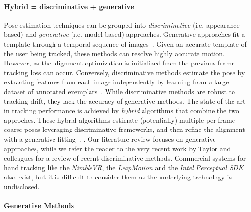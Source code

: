 \paragraph{Hybrid = discriminative + generative}
Pose estimation techniques can be grouped into \emph{discriminative} (i.e. appearance-based) and \emph{generative} (i.e. model-based) approaches. 
Generative approaches fit a template through a temporal sequence of images~\cite{oiko2011hand,melax2013dynamics,schroder2014real,tagliasacchi2015robust}. Given an accurate template of the user being tracked, these methods can resolve highly accurate motion. However, as the alignment optimization is initialized from the previous frame tracking loss can occur. 
Conversely, discriminative methods estimate the pose by extracting features from each image independently by learning from a large dataset of annotated exemplars~\cite{keskin2012hand,tang2013real,tejani2014latent,sun2015cascaded}. While discriminative methods are robust to tracking drift, they lack the accuracy of generative methods. 
The state-of-the-art in tracking performance is achieved by \emph{hybrid} algorithms that combine the two approches. These hybrid algorithms estimate (potentially) multiple per-frame coarse poses leveraging discriminative frameworks, and then refine the alignment with a generative fitting~\cite{tompson2014real,qian2014realtime,sharp2015accurate,sridhar2015fast}. 
.
Our literature review focuses on generative approaches, while we refer the reader to the very recent work by Taylor and colleagues  for a review of recent discriminative methods. Commercial systems for hand tracking like the \emph{NimbleVR\textcopyright}, the \emph{LeapMotion\textcopyright} and the \emph{Intel Perceptual SDK\textcopyright} also exist, but it is difficult to consider them as the underlying technology is undisclosed. 

\paragraph{Generative Methods}


